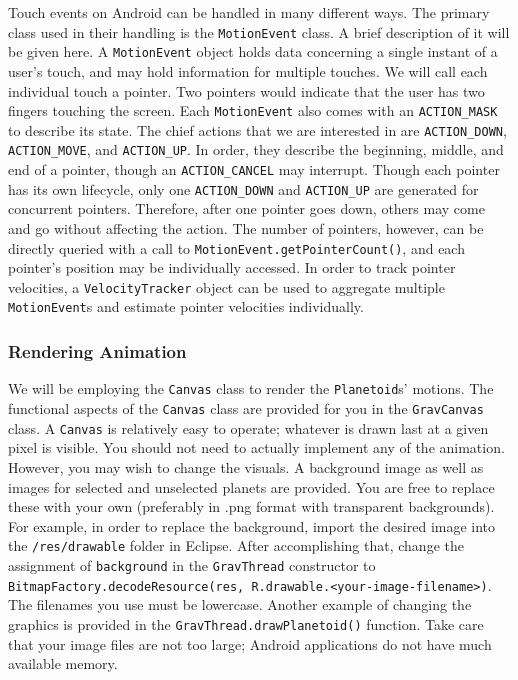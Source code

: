 Touch events on Android can be handled in many different ways.
The primary class used in their handling is the \verb=MotionEvent= class.
A brief description of it will be given here.
A \verb=MotionEvent= object holds data concerning a single instant of a user's touch, and may hold information for multiple touches.
We will call each individual touch a pointer.
Two pointers would indicate that the user has two fingers touching the screen.
Each \verb=MotionEvent= also comes with an \verb=ACTION_MASK= to describe its state. 
The chief actions that we are interested in are \verb=ACTION_DOWN=, \verb=ACTION_MOVE=, and \verb=ACTION_UP=.
In order, they describe the beginning, middle, and end of a pointer, though an \verb=ACTION_CANCEL= may interrupt.
Though each pointer has its own lifecycle, only one \verb=ACTION_DOWN= and \verb=ACTION_UP= are generated for concurrent pointers.
Therefore, after one pointer goes down, others may come and go without affecting the action.
The number of pointers, however, can be directly queried with a call to \verb=MotionEvent.getPointerCount()=, and each pointer's position may be individually accessed.
In order to track pointer velocities, a \verb=VelocityTracker= object can be used to aggregate multiple \verb=MotionEvent=s and estimate pointer velocities individually.

\subsubsection{Rendering Animation}

We will be employing the \verb=Canvas= class to render the \verb=Planetoid=s' motions.
The functional aspects of the \verb=Canvas= class are provided for you in the \verb=GravCanvas= class.
A \verb=Canvas= is relatively easy to operate; whatever is drawn last at a given pixel is visible.
You should not need to actually implement any of the animation.
However, you may wish to change the visuals.
A background image as well as images for selected and unselected planets are provided.
You are free to replace these with your own (preferably in .png format with transparent backgrounds).
For example, in order to replace the background, import the desired image into the \verb=/res/drawable= folder in Eclipse.
After accomplishing that, change the assignment of \verb=background= in the \verb=GravThread= constructor to \verb=BitmapFactory.decodeResource(res, R.drawable.<your-image-filename>)=.
The filenames you use must be lowercase.
Another example of changing the graphics is provided in the \verb=GravThread.drawPlanetoid()= function.
Take care that your image files are not too large; Android applications do not have much available memory.

